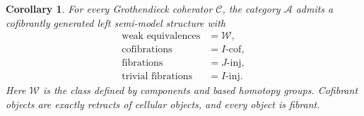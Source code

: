 \documentclass[11pt,letterpaper]{article}
\numberwithin{equation}{section}
\theoremstyle{plain}
\newtheorem{corollary}[theorem]{Corollary}
\theoremstyle{definition}
\theoremstyle{remark}
\begin{document}
\begin{corollary}\label{cor:semimodel}
For every Grothendieck coherator \(\mathcal C\), the category
\(\mathcal A\) admits a cofibrantly generated left semi-model structure
with
\[
 \begin{aligned}
  \text{weak equivalences}&=\mathcal W,\\
  \text{cofibrations}&=I\text{-}\mathrm{cof},\\
  \text{fibrations}&=J\text{-}\mathrm{inj},\\
  \text{trivial fibrations}&=I\text{-}\mathrm{inj}.
 \end{aligned}
\]
Here \(\mathcal W\) is the class defined by components and based
homotopy groups.  Cofibrant objects are exactly retracts of cellular
objects, and every object is fibrant.
\end{corollary}
\end{document}
